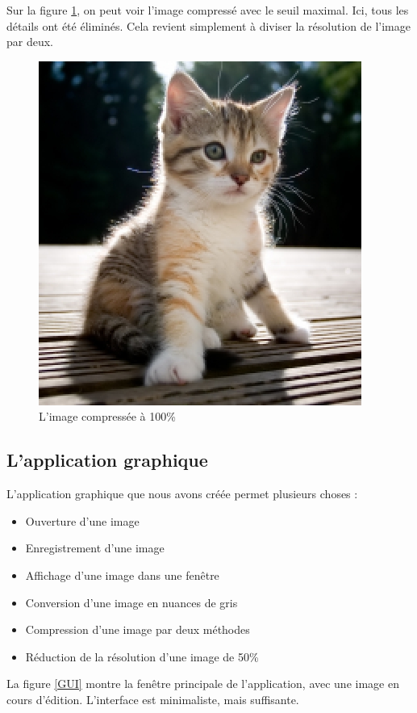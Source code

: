 \documentclass{article}
\begin{document}
Sur la figure \ref{chat3}, on peut voir l'image compressé avec le seuil maximal. Ici, tous les détails ont été éliminés. Cela revient simplement à diviser la résolution de l'image par deux.

\begin{figure}[!h]
\centering
\includegraphics[scale=0.6]{chat_compress255.jpg}
\caption{L'image compressée à 100\%}
\label{chat3}
\end{figure}


\clearpage

\subsection{L'application graphique}

L'application graphique que nous avons créée permet plusieurs choses :

\begin{itemize}
\item Ouverture d'une image
\item Enregistrement d'une image
\item Affichage d'une image dans une fenêtre
\item Conversion d'une image en nuances de gris
\item Compression d'une image par deux méthodes
\item Réduction de la résolution d'une image de 50\%
\end{itemize}

La figure \ref{GUI} montre la fenêtre principale de l'application, avec une image en cours d'édition. L'interface est minimaliste, mais suffisante.
\end{document}

